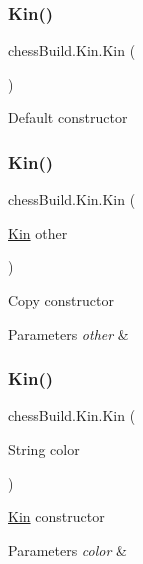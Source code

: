 \subsubsection{\texorpdfstring{Kin()}{Kin()}\hspace{0.1cm}{\footnotesize\ttfamily [1/4]}}
{\footnotesize\ttfamily chess\+Build.\+Kin.\+Kin (\begin{DoxyParamCaption}{ }\end{DoxyParamCaption})}

Default constructor \mbox{\label{classchess_build_1_1_kin_a62136f6aa7070fecc551dedb629a4838}} 
\subsubsection{\texorpdfstring{Kin()}{Kin()}\hspace{0.1cm}{\footnotesize\ttfamily [2/4]}}
{\footnotesize\ttfamily chess\+Build.\+Kin.\+Kin (\begin{DoxyParamCaption}\item[{\hyperlink{classchess_build_1_1_kin}{Kin}}]{other }\end{DoxyParamCaption})}

Copy constructor 
\begin{DoxyParams}{Parameters}
{\em other} & \\
\hline
\end{DoxyParams}
\mbox{\label{classchess_build_1_1_kin_acd1bc04a123663cf9c7bb8c0e20ede24}} 
\subsubsection{\texorpdfstring{Kin()}{Kin()}\hspace{0.1cm}{\footnotesize\ttfamily [3/4]}}
{\footnotesize\ttfamily chess\+Build.\+Kin.\+Kin (\begin{DoxyParamCaption}\item[{String}]{color }\end{DoxyParamCaption})}

\hyperlink{classchess_build_1_1_kin}{Kin} constructor 
\begin{DoxyParams}{Parameters}
{\em color} & \\
\hline
\end{DoxyParams}
\mbox{\label{classchess_build_1_1_kin_a1618ef88cbfbbb03ecbb6f03965d802a}} 
